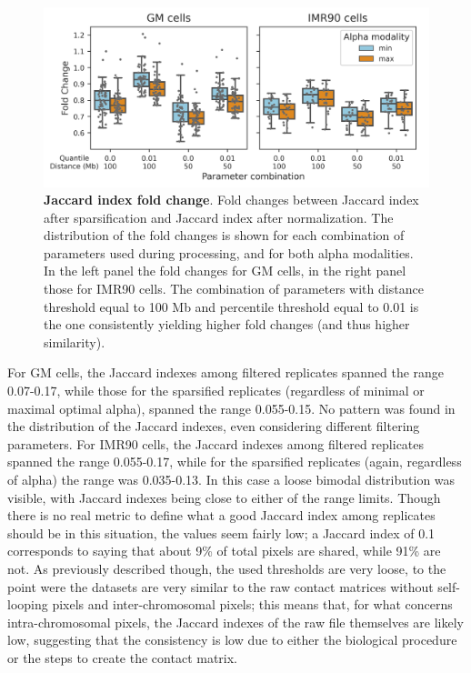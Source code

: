 \begin{figure}[h]
  \centering 
  \includegraphics[width=1\textwidth]{fold_changes.png}
  \caption{\textbf{Jaccard index fold change}. Fold changes between Jaccard index after sparsification and Jaccard index after normalization. The distribution of the fold changes is shown for each combination of parameters used during processing, and for both alpha modalities. In the left panel the fold changes for GM cells, in the right panel those for IMR90 cells. The combination of parameters with distance threshold equal to 100 Mb and percentile threshold equal to 0.01 is the one consistently yielding higher fold changes (and thus higher similarity).}
  \label{fig:foldchanges}
\end{figure}

For GM cells, the Jaccard indexes among filtered replicates spanned the range 0.07-0.17, while those for the sparsified replicates (regardless of minimal or maximal optimal alpha), spanned the range 0.055-0.15. No pattern was found in the distribution of the Jaccard indexes, even considering different filtering parameters. For IMR90 cells, the Jaccard indexes among filtered replicates spanned the range 0.055-0.17, while for the sparsified replicates (again, regardless of alpha) the range was 0.035-0.13. In this case a loose bimodal distribution was visible, with Jaccard indexes being close to either of the range limits. Though there is no real metric to define what a good Jaccard index among replicates should be in this situation, the values seem fairly low; a Jaccard index of 0.1 corresponds to saying that about 9\% of total pixels are shared, while 91\% are not. As previously described though, the used thresholds are very loose, to the point were the datasets are very similar to the raw contact matrices without self-looping pixels and inter-chromosomal pixels; this means that, for what concerns intra-chromosomal pixels, the Jaccard indexes of the raw file themselves are likely low, suggesting that the consistency is low due to either the biological procedure or the steps to create the contact matrix.

